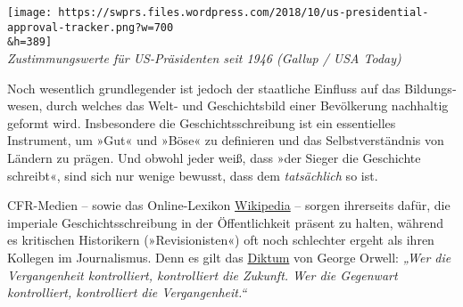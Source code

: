 \texttt{[image: https://swprs.files.wordpress.com/2018/10/us-presidential-approval-tracker.png?w=700\\\&h=389]}\\
\emph{Zustimmungswerte für US-Präsidenten seit 1946 (Gallup / USA
Today)}

Noch wesentlich grundlegender ist jedoch der staatliche Einfluss auf das
Bildungs­wesen, durch welches das Welt- und Geschichts­bild einer
Bevölkerung nachhaltig geformt wird. Insbesondere die
Geschichts­schreibung ist ein essentielles Instrument, um »Gut« und
»Böse« zu definieren und das Selbst­ver­ständnis von Ländern zu prägen.
Und obwohl jeder weiß, dass »der Sieger die Geschichte schreibt«, sind
sich nur wenige bewusst, dass dem \emph{tatsächlich} so ist.

CFR-Medien -- sowie das Online-Lexikon
\href{https://swprs.org/propaganda-in-der-wikipedia/}{Wikipedia} --
sorgen ihrerseits dafür, die imperiale Geschichts­schreibung in der
Öffent­lich­­keit präsent zu halten, während es kritischen Historikern
(»Revisionisten«) oft noch schlechter ergeht als ihren Kollegen im
Journalismus. Denn es gilt das
\href{http://www.sparknotes.com/lit/1984/quotes.html}{Diktum} von George
Orwell: \emph{„Wer die Vergangenheit kontrolliert, kontrolliert die
Zukunft. Wer die Gegenwart kontrolliert, kontrolliert die
Vergangenheit.``}

